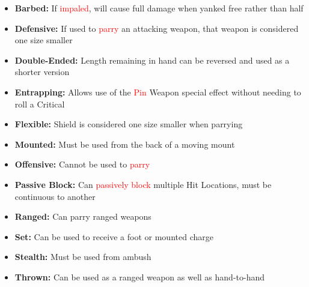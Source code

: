 \documentclass[10pt]{article}
\begin{document}
\begin{itemize}
    \item \textbf{Barbed:} If \textcolor{red}{impaled}, will cause full damage when yanked free rather than half
    \item \textbf{Defensive:} If used to \textcolor{red}{parry} an attacking weapon, that weapon is considered one size smaller
    \item \textbf{Double-Ended:} Length remaining in hand can be reversed and used as a shorter version
    \item \textbf{Entrapping:} Allows use of the \textcolor{red}{Pin} Weapon special effect without needing to roll a Critical
    \item \textbf{Flexible:} Shield is considered one size smaller when parrying
    \item \textbf{Mounted:} Must be used from the back of a moving mount
    \item \textbf{Offensive:} Cannot be used to \textcolor{red}{parry}
    \item \textbf{Passive Block:} Can \textcolor{red}{passively block} multiple Hit Locations, must be continuous to another
    \item \textbf{Ranged:} Can parry ranged weapons
    \item \textbf{Set:} Can be used to receive a foot or mounted charge
    \item \textbf{Stealth:} Must be used from ambush
    \item \textbf{Thrown:} Can be used as a ranged weapon as well as hand-to-hand
\end{itemize}
\end{document}
